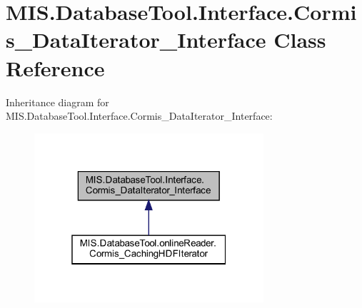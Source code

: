 \hypertarget{classMIS_1_1DatabaseTool_1_1Interface_1_1Cormis__DataIterator__Interface}{}\section{M\+I\+S.\+Database\+Tool.\+Interface.\+Cormis\+\_\+\+Data\+Iterator\+\_\+\+Interface Class Reference}
\label{classMIS_1_1DatabaseTool_1_1Interface_1_1Cormis__DataIterator__Interface}


Inheritance diagram for M\+I\+S.\+Database\+Tool.\+Interface.\+Cormis\+\_\+\+Data\+Iterator\+\_\+\+Interface\+:\nopagebreak
\begin{figure}[H]
\begin{center}
\leavevmode
\includegraphics[width=241pt]{classMIS_1_1DatabaseTool_1_1Interface_1_1Cormis__DataIterator__Interface__inherit__graph}
\end{center}
\end{figure}
